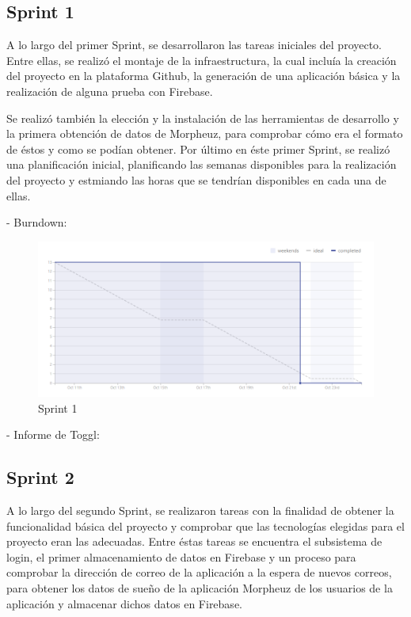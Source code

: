 \documentclass[11pt,openany]{book}
\begin{document}
\pagebreak
\subsection{Sprint 1}

A lo largo del primer Sprint, se desarrollaron las tareas iniciales del proyecto. Entre ellas, se realizó el montaje de la infraestructura, la cual incluía la creación del proyecto en la plataforma Github, la generación de una aplicación básica y la realización de alguna prueba con Firebase.

Se realizó también la elección y la instalación de las herramientas de desarrollo y la primera obtención de datos de Morpheuz, para comprobar cómo era el formato de éstos y como se podían obtener. Por último en éste primer Sprint, se realizó una planificación inicial, planificando las semanas disponibles para la realización del proyecto y estmiando las horas que se tendrían disponibles en cada una de ellas.

- Burndown:

\begin{figure}[H]
\centering
\includegraphics[totalheight=7cm]{burndowns/Sprint1.png}
\caption{Sprint 1}
\end{figure}

- Informe de Toggl:



\subsection{Sprint 2}

A lo largo del segundo Sprint, se realizaron tareas con la finalidad de obtener la funcionalidad básica del proyecto y comprobar que las tecnologías elegidas para el proyecto eran las adecuadas. Entre éstas tareas se encuentra el subsistema de login, el primer almacenamiento de datos en Firebase y un proceso para comprobar la dirección de correo de la aplicación a la espera de nuevos correos, para obtener los datos de sueño de la aplicación Morpheuz de los usuarios de la aplicación y almacenar dichos datos en Firebase.
\end{document}
